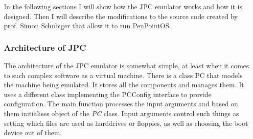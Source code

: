 In the following sections I will show how the JPC emulator works and how it is
designed. Then I will describe the modifications to the source code created by
prof. Simon Schubiger that allow it to run PenPointOS.

\subsubsection{Architecture of JPC}

The architecture of the JPC emulator is somewhat simple, at least when it comes
to such complex software as a virtual machine. There is a class PC that models
the machine being emulated. It stores all the components and manages them. It
uses a different class implementing the PCConfig interface to provide
configuration. The main function processes the input arguments and based on
them initialises object of the \emph{PC} class. Input arguments control such things
as setting which files are used as harddrives or floppies, as well as choosing
the boot device out of them.

\begin{codeblock}
    
\end{codeblock}

%
%

